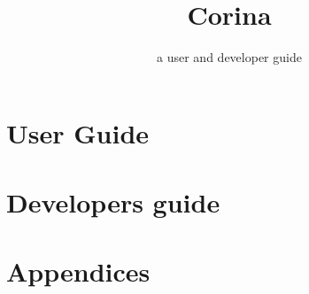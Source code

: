 \documentclass[10pt,letter, twopage headsepline]{manual}
\title{Corina}
\subtitle{a user and developer guide}
\begin{document}
  
  

  \part{User Guide}
    
    
    
    
    
    
    
    
    
    
    

  \part{Developers guide}
    
    
    

  \part{Appendices}
    \appendix
    
    

    \cleardoublepage
    
    

    \cleardoublepage
    \printindex

    
\end{document}

